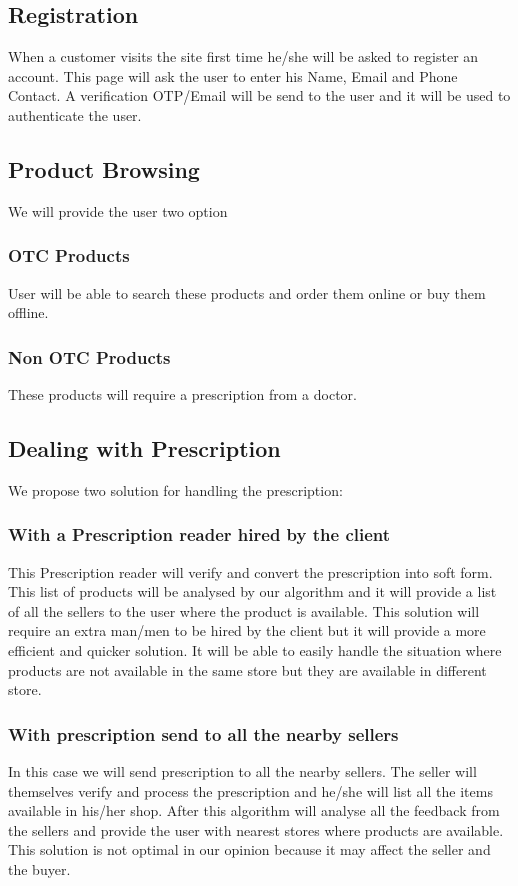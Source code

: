 \documentclass[fleqn,10pt]{SelfArx} %
\begin{document}
\subsection{Registration}

When a customer visits the site first time he/she will be asked to register an account. This page will ask the user to enter his Name, Email and Phone Contact. A verification OTP/Email will be send to the user and it will be used to authenticate the user.

\subsection{Product Browsing}
We will provide the user two option
\subsubsection{OTC Products}
User will be able to search these products and order them online or buy them offline.
\subsubsection{Non OTC Products}
These products will require a prescription from a doctor.

\subsection{Dealing with Prescription}
We propose two solution for handling the prescription:
\subsubsection{With a Prescription reader hired by the client}
This Prescription reader will verify and convert the prescription into soft form. This list of products will be analysed by our algorithm and it will provide a list of all the sellers to the user where the product is available. This solution will require an extra man/men to be hired by the client but it will provide a more efficient and quicker solution. It will be able to easily handle the situation where products are not available in the same store but they are available in different store.
\subsubsection{With prescription send to all the nearby sellers}
In this case we will send prescription to all the nearby sellers. The seller will themselves verify and process the prescription and he/she will list all the items available in his/her shop. After this algorithm will analyse all the feedback from the sellers and provide the user with nearest stores where products are available. This solution is not optimal in our opinion because it may affect the seller and the buyer.
\end{document}

